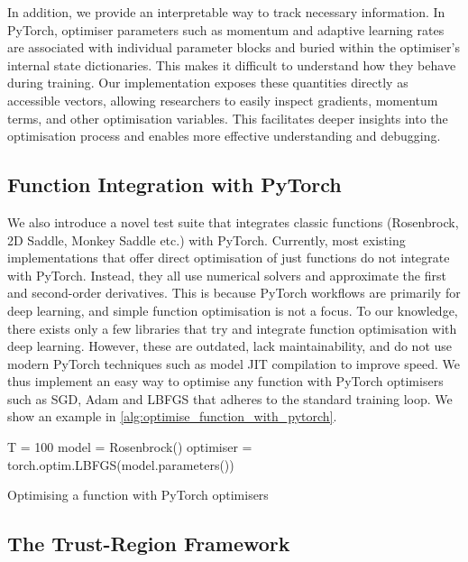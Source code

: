In addition, we provide an interpretable way to track necessary information. In PyTorch, optimiser parameters such as momentum and adaptive learning rates are associated with individual parameter blocks and buried within the optimiser's internal state dictionaries. This makes it difficult to understand how they behave during training. Our implementation exposes these quantities directly as accessible vectors, allowing researchers to easily inspect gradients, momentum terms, and other optimisation variables. This facilitates deeper insights into the optimisation process and enables more effective understanding and debugging.

\subsection{Function Integration with PyTorch}
\label{ssec:function_integration_with_pytorch}

We also introduce a novel test suite that integrates classic functions (Rosenbrock, 2D Saddle, Monkey Saddle etc.) with PyTorch. Currently, most existing implementations that offer direct optimisation of just functions do not integrate with PyTorch. Instead, they all use numerical solvers and approximate the first and second-order derivatives. This is because PyTorch workflows are primarily for deep learning, and simple function optimisation is not a focus. To our knowledge, there exists only a few libraries that try and integrate function optimisation with deep learning. However, these are outdated, lack maintainability, and do not use modern PyTorch techniques such as model JIT compilation to improve speed. We thus implement an easy way to optimise any function with PyTorch optimisers such as SGD, Adam and LBFGS that adheres to the standard training loop. We show an example in \cref{alg:optimise_function_with_pytorch}.

\begin{algorithm}[h]
    \small
    \DontPrintSemicolon
    T = 100\;
    model = Rosenbrock()\;
    optimiser = torch.optim.LBFGS(model.parameters())\;
    \caption{Optimising a function with PyTorch optimisers}
    \label{alg:optimise_function_with_pytorch}
\end{algorithm}


\subsection{The Trust-Region Framework}
\label{ssec:the_trust_region_framework}

